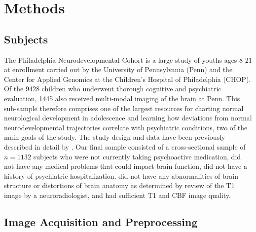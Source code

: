 \documentclass[review]{elsarticle}
\begin{document}
\section{Methods}
\label{sec:Methods}

\subsection{Subjects}
\label{subsec:Subjects}

The Philadelphia Neurodevelopmental Cohort is a large study of youths ages 8-21 at enrollment carried out by the University of Pennsylvania (Penn) and the Center for Applied Genomics at the Children's Hospital of Philadelphia (CHOP). Of the 9428 children who underwent thorough cognitive and psychiatric evaluation, 1445 also received multi-modal imaging of the brain at Penn. This sub-sample therefore comprises one of the largest resources for charting normal neurological development in adolescence and learning how deviations from normal neurodevelopmental trajectories correlate with psychiatric conditions, two of the main goals of the study.  The study design and data have been previously described in detail by \citep{Sat+etal:14}. Our final sample consisted of a cross-sectional sample of $n=1132$ subjects who were not currently taking psychoactive medication, did not have any medical problems that could impact brain function, did not have a history of psychiatric hospitalization, did not have any abnormalities of brain structure or distortions of brain anatomy as determined by review of the T1 image by a neuroradiologist, and had sufficient T1 and CBF image quality. 

\subsection{Image Acquisition and Preprocessing}
\label{subsec:Preprocessing}
\end{document}
